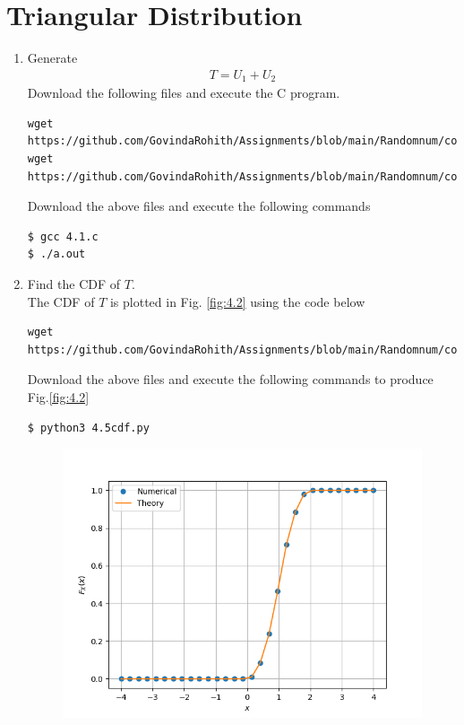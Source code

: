 \documentclass[journal,12pt,twocolumn]{IEEEtran}
\renewcommand\thesection{\arabic{section}}
\begin{document}
\section{Triangular Distribution}
\begin{enumerate}[label=\thesection.\arabic*
,ref=\thesection.\theenumi]
    \item Generate
    \begin{align}
        T=U_1+U_2
    \end{align}
    \solution Download the following files and execute the  C program.
\begin{lstlisting}
wget https://github.com/GovindaRohith/Assignments/blob/main/Randomnum/codes/4.1.c
wget https://github.com/GovindaRohith/Assignments/blob/main/Randomnum/codes/source.h
\end{lstlisting}
Download the above files and execute the following commands
\begin{lstlisting}
$ gcc 4.1.c
$ ./a.out
\end{lstlisting}
\item Find the CDF of $T$.\\
\solution The CDF of $T$ is plotted in Fig. \ref{fig:4.2} using the code below
\begin{lstlisting}
wget https://github.com/GovindaRohith/Assignments/blob/main/Randomnum/codes/4.5cdf.py
\end{lstlisting}
Download the above files and execute the following commands to produce Fig.\ref{fig:4.2}
\begin{lstlisting}
$ python3 4.5cdf.py
\end{lstlisting}
\begin{figure}[!h]
\centering
\includegraphics[width=\columnwidth]{./figs/4.5cdf.png}

\end{figure}
\end{enumerate}
\end{document}
